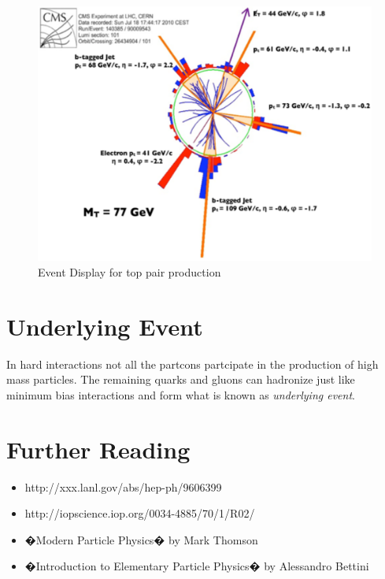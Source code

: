\begin{figure}[h]
\centering\includegraphics[scale=0.5]{./protonprotoncollisions/Pictures/fig13.pdf}
\caption{Event Display for top pair production}
\label{fig:topdisk}
\end{figure}

\section{Underlying Event}

In hard interactions not all the partcons partcipate in the production of high mass particles.  The remaining quarks and gluons can hadronize just like  minimum bias interactions and form what is known as {\it underlying event}. 


\section{Further Reading}

\begin{itemize}
\item http://xxx.lanl.gov/abs/hep-ph/9606399
\item http://iopscience.iop.org/0034-4885/70/1/R02/
\item �Modern Particle Physics� by Mark Thomson
\item �Introduction to Elementary Particle Physics� by Alessandro Bettini
\end{itemize}
